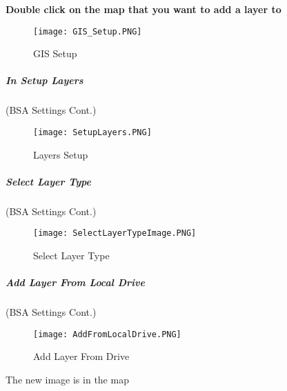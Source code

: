 \vspace{.5in}

\noindent \textbf{Double click on the map that you want to add a layer to}
\vspace{.5in}

%
%
\begin{figure}[h!]
\centering
    \texttt{[image: GIS\_Setup.PNG]}
\caption{GIS Setup}
\end{figure}
\clearpage
%
%
%
\subparagraph[Layers Setup ]{\Large In Setup Layers\texorpdfstring{\\}{}}
(BSA Settings Cont.)
\vspace{.75in}

\vspace{.5in}
%
%
\begin{figure}[h!]
\centering
    \texttt{[image: SetupLayers.PNG]}
\caption{Layers Setup}
\end{figure}
\clearpage
%
%
%
\subparagraph[Select Layer Type ]{\Large Select Layer Type\texorpdfstring{\\}{}}
(BSA Settings Cont.)
\vspace{.75in}

\vspace{.5in}
%
%
\begin{figure}[h!]
\centering
    \texttt{[image: SelectLayerTypeImage.PNG]}
\caption{Select Layer Type}
\end{figure}
\clearpage
%
%
%
\subparagraph[Add Layer From Local Drive]{\Large Add Layer From Local Drive\texorpdfstring{\\}{}}
(BSA Settings Cont.)
\vspace{.75in}

\vspace{.5in}

%
%
\begin{figure}[h!]
\centering
    \texttt{[image: AddFromLocalDrive.PNG]}
\caption{Add Layer From Drive}
\end{figure}
{\Large The new image is in the map}
\clearpage

